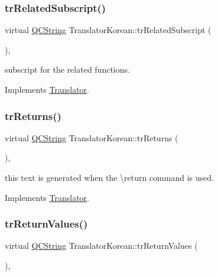 \subsubsection{\texorpdfstring{trRelatedSubscript()}{trRelatedSubscript()}}
{\footnotesize\ttfamily virtual \mbox{\hyperlink{class_q_c_string}{Q\+C\+String}} Translator\+Korean\+::tr\+Related\+Subscript (\begin{DoxyParamCaption}{ }\end{DoxyParamCaption})\hspace{0.3cm}{\ttfamily [inline]}, {\ttfamily [virtual]}}

subscript for the related functions. 

Implements \mbox{\hyperlink{class_translator}{Translator}}.

\mbox{\label{class_translator_korean_adb482ae60c550ffdae208d91f2090ec4}} 
\subsubsection{\texorpdfstring{trReturns()}{trReturns()}}
{\footnotesize\ttfamily virtual \mbox{\hyperlink{class_q_c_string}{Q\+C\+String}} Translator\+Korean\+::tr\+Returns (\begin{DoxyParamCaption}{ }\end{DoxyParamCaption})\hspace{0.3cm}{\ttfamily [inline]}, {\ttfamily [virtual]}}

this text is generated when the \textbackslash{}return command is used. 

Implements \mbox{\hyperlink{class_translator}{Translator}}.

\mbox{\label{class_translator_korean_a87748fc58e2c9caf6f675de139fad528}} 
\subsubsection{\texorpdfstring{trReturnValues()}{trReturnValues()}}
{\footnotesize\ttfamily virtual \mbox{\hyperlink{class_q_c_string}{Q\+C\+String}} Translator\+Korean\+::tr\+Return\+Values (\begin{DoxyParamCaption}{ }\end{DoxyParamCaption})\hspace{0.3cm}{\ttfamily [inline]}, {\ttfamily [virtual]}}

